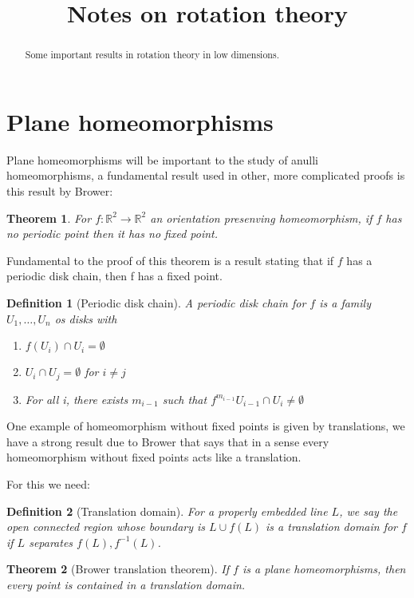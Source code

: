 \documentclass{article}
\title{Notes on rotation theory}
\newtheorem{theorem}{Theorem}[section]
\newtheorem{definition}{Definition}[section]
\begin{document}
\maketitle


\begin{abstract}
Some important results in rotation theory in low dimensions.
\end{abstract}



\section{Plane homeomorphisms}

Plane homeomorphisms will be important to the study of anulli homeomorphisms,
a fundamental result used in other, more complicated proofs is this result by
Brower:

\begin{theorem}
    For $f:\mathbb{R}^2\to \mathbb{R}^2$ an orientation presenving
    homeomorphism, if $f$ has no periodic point then it has no fixed point.

\end{theorem}


Fundamental to the proof of this theorem is a result stating that if 
$f$ has a periodic disk chain, then f has a fixed point.


\begin{definition}[Periodic disk chain]
A periodic disk chain for $f$ is a family $U_1,\ldots, U_n$ os disks with 
\begin{enumerate}
    \item $f(U_i)\cap U_i=\emptyset$
    \item $U_i\cap U_j=\emptyset$ for $i\neq j$
    \item For all i, there exists $m_{i-1}$ such that $f^{m_{i-1}}U_{i-1}\cap 
    U_i \neq \emptyset$
\end{enumerate}
\end{definition}



One example of homeomorphism without fixed points is given by translations,
we have a strong result due to Brower that says that in a sense every homeomorphism
without fixed points acts like a translation.

For this we need:

\begin{definition}[Translation domain]
For a properly embedded line $L$, we say the open connected region whose
boundary is $L\cup f(L)$ is a translation domain for $f$ if $L$ separates
$f(L),f^{-1}(L)$.

\end{definition}


\begin{theorem}[Brower translation theorem]
    If $f$ is a plane homeomorphisms, then every point is contained in a 
    translation domain.
\end{theorem}
\end{document}
